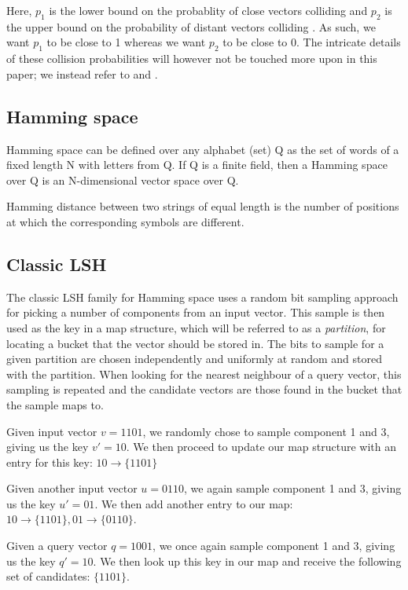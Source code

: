 Here, $p_1$ is the lower bound on the probablity of close vectors colliding and $p_2$ is the upper bound on the probability of distant vectors colliding \cite[p. 100]{DBLP:books/cu/LeskovecRU14}. As such, we want $p_1$ to be close to 1 whereas we want $p_2$ to be close to 0. The intricate details of these collision probabilities will however not be touched more upon in this paper; we instead refer to \cite{DBLP:conf/stoc/IndykM98} and \cite{DBLP:books/cu/LeskovecRU14}.


\subsection{Hamming space}
Hamming space can be defined over any alphabet (set) Q as the set of words of a
fixed length N with letters from Q. If Q is a finite field, then a Hamming
space over Q is an N-dimensional vector space over Q.

Hamming distance between two strings of equal length is the number of positions
at which the corresponding symbols are different.


\subsection{Classic LSH}
\label{background-classic-lsh}

The classic LSH family for Hamming space uses a random bit sampling approach for picking a number of components from an input vector. This sample is then used as the key in a map structure, which will be referred to as a \textit{partition}, for locating a bucket that the vector should be stored in. The bits to sample for a given partition are chosen independently and uniformly at random and stored with the partition. When looking for the nearest neighbour of a query vector, this sampling is repeated and the candidate vectors are those found in the bucket that the sample maps to.

\begin{example}
\label{example-classic-sampling}
Given input vector $v = 1101$, we randomly chose to sample component 1 and 3, giving us the key $v' = 10$. We then proceed to update our map structure with an entry for this key: $10 \rightarrow \{1101\}$

Given another input vector $u = 0110$, we again sample component 1 and 3, giving us the key $u' = 01$. We then add another entry to our map: $10 \rightarrow \{1101\}, 01 \rightarrow \{0110\}$.

Given a query vector $q = 1001$, we once again sample component 1 and 3, giving us the key $q' = 10$. We then look up this key in our map and receive the following set of candidates: $\{1101\}$.
\end{example}

